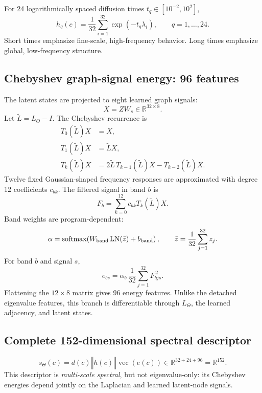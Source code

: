\documentclass[11pt,a4paper]{article}
\newcommand{\R}{\mathbb{R}}
\newcommand{\concat}{\mathbin{\Vert}}
\newcommand{\softmax}{\operatorname{softmax}}
\newcommand{\LN}{\operatorname{LN}}
\begin{document}
For 24 logarithmically spaced diffusion times
$t_q\in[10^{-2},10^2]$,
\begin{equation}
h_q(c)=\frac{1}{32}\sum_{i=1}^{32}\exp(-t_q\lambda_i),
\qquad q=1,\ldots,24.
\end{equation}
Short times emphasize fine-scale, high-frequency behavior. Long times emphasize
global, low-frequency structure.

\subsection{Chebyshev graph-signal energy: 96 features}

The latent states are projected to eight learned graph signals:
\begin{equation}
X=ZW_s\in\R^{32\times8}.
\end{equation}
Let $\widetilde L=L_\Theta-I$. The Chebyshev recurrence is
\begin{align}
T_0(\widetilde L)X&=X,\\
T_1(\widetilde L)X&=\widetilde L X,\\
T_k(\widetilde L)X
&=2\widetilde L\,T_{k-1}(\widetilde L)X
-T_{k-2}(\widetilde L)X.
\end{align}
Twelve fixed Gaussian-shaped frequency responses are approximated with degree
12 coefficients $c_{bk}$. The filtered signal in band $b$ is
\begin{equation}
F_b=\sum_{k=0}^{12}c_{bk}T_k(\widetilde L)X.
\end{equation}
Band weights are program-dependent:
\begin{equation}
\alpha=\softmax\!\left(W_{\rm band}\LN(\bar z)+b_{\rm band}\right),
\qquad
\bar z=\frac1{32}\sum_{j=1}^{32}z_j.
\end{equation}
For band $b$ and signal $s$,
\begin{equation}
e_{bs}=\alpha_b\,\frac1{32}\sum_{j=1}^{32}F_{bjs}^{\,2}.
\end{equation}
Flattening the $12\times8$ matrix gives 96 energy features. Unlike the detached
eigenvalue features, this branch is differentiable through $L_\Theta$, the learned
adjacency, and latent states.

\subsection{Complete 152-dimensional spectral descriptor}

\begin{equation}
s_\Theta(c)
=d(c)\concat h(c)\concat\operatorname{vec}(e(c))
\in\R^{32+24+96}
=\R^{152}.
\end{equation}
This descriptor is \emph{multi-scale spectral}, but not eigenvalue-only:
its Chebyshev energies depend jointly on the Laplacian and learned latent-node
signals.
\end{document}
